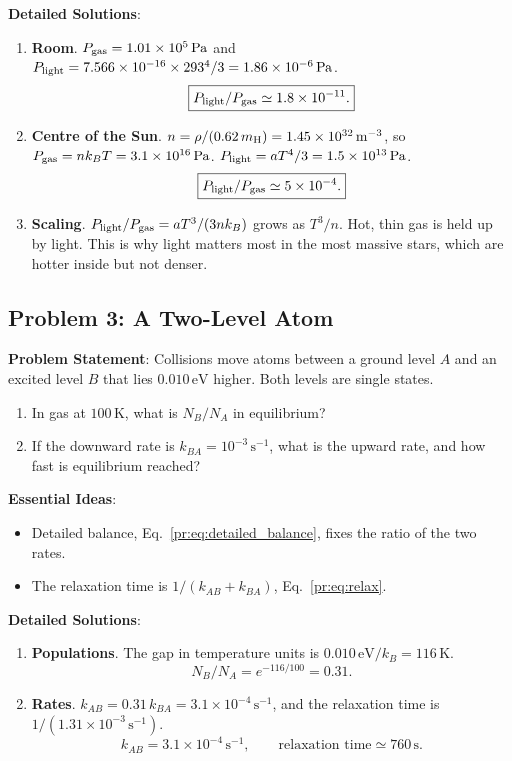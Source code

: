 \textbf{Detailed Solutions}:
\begin{enumerate}[label=(\alph*)]
	\item \textbf{Room}. $P_{\rm gas}=1.01\times10^5\,\mathrm{Pa}$ and $P_{\rm light}=7.566\times10^{-16}\times293^4/3=1.86\times10^{-6}\,\mathrm{Pa}$.
	\[
	\boxed{P_{\rm light}/P_{\rm gas}\simeq1.8\times10^{-11}.}
	\]
	\item \textbf{Centre of the Sun}. $n=\rho/(0.62\,m_{\rm H})=1.45\times10^{32}\,\mathrm{m^{-3}}$, so $P_{\rm gas}=nk_BT=3.1\times10^{16}\,\mathrm{Pa}$. $P_{\rm light}=aT^4/3=1.5\times10^{13}\,\mathrm{Pa}$.
	\[
	\boxed{P_{\rm light}/P_{\rm gas}\simeq5\times10^{-4}.}
	\]
	\item \textbf{Scaling}. $P_{\rm light}/P_{\rm gas}=aT^3/(3nk_B)$ grows as $T^3/n$. Hot, thin gas is held up by light. This is why light matters most in the most massive stars, which are hotter inside but not denser.
\end{enumerate}

\subsection{Problem 3: A Two-Level Atom}
\label{pr:prob:twolevel}

\textbf{Problem Statement}: Collisions move atoms between a ground level $A$ and an excited level $B$ that lies $0.010\,\mathrm{eV}$ higher. Both levels are single states.
\begin{enumerate}[label=(\alph*)]
	\item In gas at $100\,\mathrm K$, what is $N_B/N_A$ in equilibrium?
	\item If the downward rate is $k_{BA}=10^{-3}\,\mathrm{s^{-1}}$, what is the upward rate, and how fast is equilibrium reached?
\end{enumerate}

\textbf{Essential Ideas}:
\begin{itemize}
	\item Detailed balance, Eq.~\eqref{pr:eq:detailed_balance}, fixes the ratio of the two rates.
	\item The relaxation time is $1/(k_{AB}+k_{BA})$, Eq.~\eqref{pr:eq:relax}.
\end{itemize}

\textbf{Detailed Solutions}:
\begin{enumerate}[label=(\alph*)]
	\item \textbf{Populations}. The gap in temperature units is $0.010\,\mathrm{eV}/k_B=116\,\mathrm K$.
	\[
	\boxed{N_B/N_A=e^{-116/100}=0.31.}
	\]
	\item \textbf{Rates}. $k_{AB}=0.31\,k_{BA}=3.1\times10^{-4}\,\mathrm{s^{-1}}$, and the relaxation time is $1/(1.31\times10^{-3}\,\mathrm{s^{-1}})$.
	\[
	\boxed{k_{AB}=3.1\times10^{-4}\,\mathrm{s^{-1}},\qquad\text{relaxation time}\simeq760\,\mathrm s.}
	\]
\end{enumerate}

